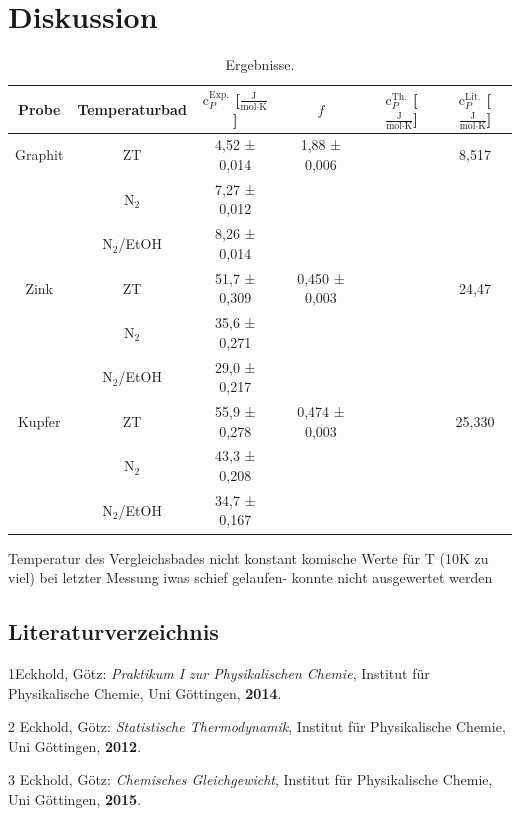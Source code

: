 \documentclass[12pt,a4paper,titlepage,headinclude,bibtotoc]{scrartcl}
\begin{document}
\FloatBarrier


\section{Diskussion}
\begin{table}[h!]
\centering
\caption{Ergebnisse.}
\begin{tabular}{c|c|c|c|c|c}
Probe&Temperaturbad&$\text{c}_P^{\text{Exp.}}$ [$\frac{\text{J}}{\text{mol}\cdot\text{K}}$] & $f$ &$\text{c}_P^{\text{Th.}}$ [$\frac{\text{J}}{\text{mol}\cdot\text{K}}$] &$\text{c}_P^{\text{Lit.}}$ [$\frac{\text{J}}{\text{mol}\cdot\text{K}}$] \\
\hline
Graphit& ZT&4,52 ± 0,014 &1,88 ± 0,006& &8,517 \\
\hline
&$\text{N}_2$&7,27 ± 0,012& & \\
\hline
&$\text{N}_2$/EtOH&8,26 ± 0,014 & &\\
\hline
Zink &ZT& 51,7 ± 0,309&  0,450 ± 0,003& &24,47\\
\hline
&$\text{N}_2$& 35,6 ± 0,271&&\\
\hline
&$\text{N}_2$/EtOH& 29,0 ± 0,217&&\\
\hline
Kupfer &ZT&55,9 ± 0,278& 0,474 ± 0,003& &25,330\\
\hline
&$\text{N}_2$&43,3 ± 0,208&&\\
\hline
&$\text{N}_2$/EtOH& 34,7 ± 0,167&&\\
\end{tabular}
\end{table}
\FloatBarrier
Temperatur des Vergleichsbades nicht konstant
komische Werte für T (10K zu viel)
bei letzter Messung iwas schief gelaufen- konnte nicht ausgewertet werden


\newpage


\subsection{Literaturverzeichnis}
1\quad Eckhold, Götz: \emph{Praktikum I zur Physikalischen Chemie}, Institut für Physikalische Chemie, Uni Göttingen, \textbf{2014}.
\vspace{0,5 cm}

2 \quad Eckhold, Götz: \emph{Statistische Thermodynamik}, Institut für Physikalische Chemie, Uni Göttingen, \textbf{2012}.

\vspace{0,5cm}

3 \quad Eckhold, Götz: \emph{Chemisches Gleichgewicht}, Institut für Physikalische Chemie, Uni Göttingen, \textbf{2015}.\\
\end{document}

